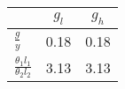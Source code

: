 \begin{tiny}\begin{tabular}{|l|c|c|}
\hline
&\textbf{$g_l$}&\textbf{$g_h$}\\\hline
\textbf{$\frac{g}{y}$}&0.18&0.18\\\hline
\textbf{$\frac{\theta_1 l_1}{\theta_2 l_2}$}&3.13&3.13\\\hline
\end{tabular}
\end{tiny}
